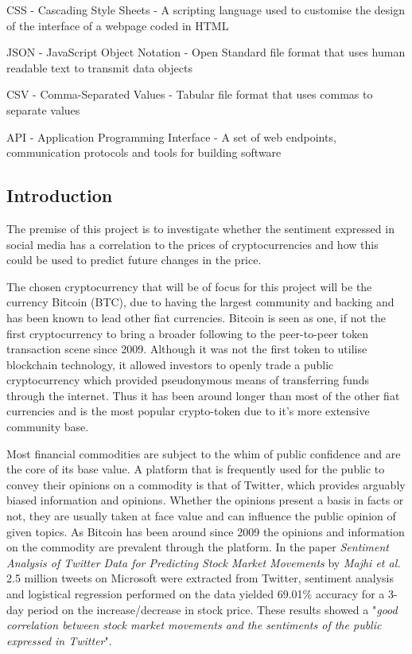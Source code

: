 \documentclass[oneside, 12pt]{article}
\begin{document}
	CSS - Cascading Style Sheets - A scripting language used to customise the design of the interface of a webpage coded in HTML
	
	JSON - JavaScript Object Notation - Open Standard file format that uses human readable text to transmit data objects
	
	CSV - Comma-Separated Values - Tabular file format that uses commas to separate values
	
	API - Application Programming Interface - A set of web endpoints, communication protocols and tools for building software
	
	\newpage
	
	\begin{center}
		\tableofcontents
	\end{center}
	
	\newpage
	\begin{center}
		\section{Introduction}\label{introduction}
	\end{center}
	The premise of this project is to investigate whether the sentiment expressed in social media has a correlation to the prices of cryptocurrencies and how this could be used to predict future changes in the price. 
	
	The chosen cryptocurrency that will be of focus for this project will be the currency Bitcoin (BTC), due to having the largest community and backing and has been known to lead other fiat currencies. Bitcoin is seen as one, if not the first cryptocurrency to bring a broader following to the peer-to-peer token transaction scene since 2009. Although it was not the first token to utilise blockchain technology, it allowed investors to openly trade a public cryptocurrency which provided pseudonymous means of transferring funds through the internet. Thus it has been around longer than most of the other fiat currencies and is the most popular crypto-token due to it's more extensive community base.
	
	Most financial commodities are subject to the whim of public confidence and are the core of its base value. A platform that is frequently used for the public to convey their opinions on a commodity is that of Twitter, which provides arguably biased information and opinions. Whether the opinions present a basis in facts or not, they are usually taken at face value and can influence the public opinion of given topics. As Bitcoin has been around since 2009 the opinions and information on the commodity are prevalent through the platform. 
	In the paper \textit{Sentiment Analysis of Twitter Data for Predicting Stock Market Movements} by \textit{Majhi et al.} \cite{SaTdpsmm} 2.5 million tweets on Microsoft were extracted from Twitter, sentiment analysis and logistical regression performed on the data yielded 69.01\% accuracy for a 3-day period on the increase/decrease in stock price. These results showed a "\textit{good correlation between stock market movements and the sentiments of the public expressed in Twitter}".
	
\end{document}
